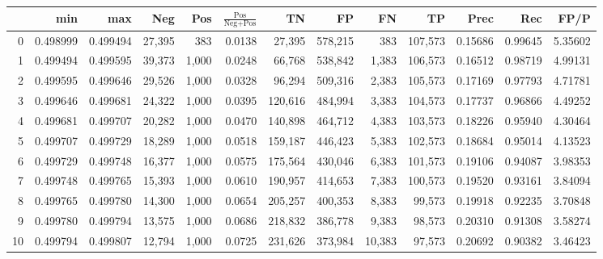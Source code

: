 \begin{tabular}{rrrrrrrrrrrrr}
\toprule
{} &       min &       max &     Neg &    Pos & $\frac{\text{Pos}}{\text{Neg}+\text{Pos}}$ &       TN &       FP &       FN &       TP &     Prec &      Rec &     FP/P \\
\midrule
0   &  0.498999 &  0.499494 &  27,395 &    383 &                                     0.0138 &   27,395 &  578,215 &      383 &  107,573 &  0.15686 &  0.99645 &  5.35602 \\
1   &  0.499494 &  0.499595 &  39,373 &  1,000 &                                     0.0248 &   66,768 &  538,842 &    1,383 &  106,573 &  0.16512 &  0.98719 &  4.99131 \\
2   &  0.499595 &  0.499646 &  29,526 &  1,000 &                                     0.0328 &   96,294 &  509,316 &    2,383 &  105,573 &  0.17169 &  0.97793 &  4.71781 \\
3   &  0.499646 &  0.499681 &  24,322 &  1,000 &                                     0.0395 &  120,616 &  484,994 &    3,383 &  104,573 &  0.17737 &  0.96866 &  4.49252 \\
4   &  0.499681 &  0.499707 &  20,282 &  1,000 &                                     0.0470 &  140,898 &  464,712 &    4,383 &  103,573 &  0.18226 &  0.95940 &  4.30464 \\
5   &  0.499707 &  0.499729 &  18,289 &  1,000 &                                     0.0518 &  159,187 &  446,423 &    5,383 &  102,573 &  0.18684 &  0.95014 &  4.13523 \\
6   &  0.499729 &  0.499748 &  16,377 &  1,000 &                                     0.0575 &  175,564 &  430,046 &    6,383 &  101,573 &  0.19106 &  0.94087 &  3.98353 \\
7   &  0.499748 &  0.499765 &  15,393 &  1,000 &                                     0.0610 &  190,957 &  414,653 &    7,383 &  100,573 &  0.19520 &  0.93161 &  3.84094 \\
8   &  0.499765 &  0.499780 &  14,300 &  1,000 &                                     0.0654 &  205,257 &  400,353 &    8,383 &   99,573 &  0.19918 &  0.92235 &  3.70848 \\
9   &  0.499780 &  0.499794 &  13,575 &  1,000 &                                     0.0686 &  218,832 &  386,778 &    9,383 &   98,573 &  0.20310 &  0.91308 &  3.58274 \\
10  &  0.499794 &  0.499807 &  12,794 &  1,000 &                                     0.0725 &  231,626 &  373,984 &   10,383 &   97,573 &  0.20692 &  0.90382 &  3.46423 \\

\end{tabular}
